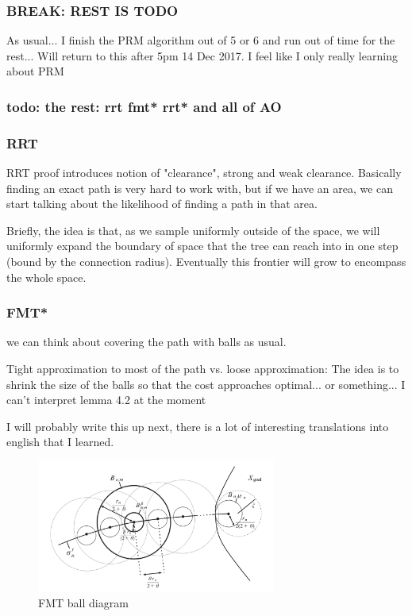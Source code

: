 \documentclass[a4paper]{article}
\begin{document}
\subsubsection{BREAK: REST IS TODO}
As usual... I finish the PRM algorithm out of 5 or 6 and run out of time for the
    rest... Will return to this after 5pm 14 Dec 2017. I feel like I only really
    learning about PRM 

\subsubsection{todo: the rest: rrt fmt* rrt* and all of AO}


\subsubsection{RRT}


    RRT proof \cite{RRT*} introduces notion of "clearance", strong and weak
    clearance. Basically finding an exact path is very hard to work with, but if
    we have an area, we can start talking about the likelihood of finding a path
    in that area.

Briefly, the idea is that, as we sample uniformly outside of the space, we will
uniformly expand the boundary of space that the tree can reach into in one step
    (bound by the connection radius). Eventually this frontier will grow to
    encompass the whole space.

\subsubsection{FMT*}

we can think about covering the path with balls as
usual. 

Tight approximation to most of the path vs. loose approximation:
The idea is to shrink the size of the balls so that the cost approaches
    optimal... or something... I can't interpret lemma 4.2 at the moment


I will probably write this up next, there is a lot of interesting translations
    into english that I learned.
 
 
\begin{figure} \centering
    \includegraphics[width=0.7\textwidth]{FMTball.png}
     \caption{FMT ball diagram} 
 \end{figure}
 
\end{document}

